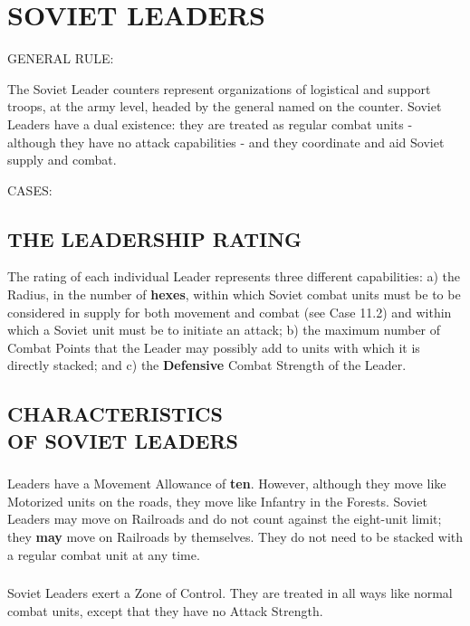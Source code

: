 \clearpage
\section{SOVIET LEADERS}

GENERAL RULE:

The Soviet Leader counters represent organizations of logistical and support troops, at the army level, headed by the general named on the counter. Soviet Leaders have a dual existence: they are treated as regular combat units - although they have no attack capabilities - and they coordinate and aid Soviet supply and combat.

CASES:

\subsection{THE LEADERSHIP RATING}

The rating of each individual Leader represents three different capabilities: a) the Radius, in the number of \textbf{hexes}, within which Soviet combat units must be to be considered in supply for both movement and combat (see Case 11.2) and within which a Soviet unit must be to initiate an attack; b) the maximum number of Combat Points that the Leader may possibly add to units with which it is directly stacked; and c) the \textbf{Defensive} Combat Strength of the Leader.

\subsection{CHARACTERISTICS\\OF SOVIET LEADERS}

\subsubsection{} Leaders have a Movement Allowance of \textbf{ten}. However, although they move like Motorized units on the roads, they move like Infantry in the Forests. Soviet Leaders may move on Railroads and do not count against the eight-unit limit; they \textbf{may} move on Railroads by themselves. They do not need to be stacked with a regular combat unit at any time.

\subsubsection{} Soviet Leaders exert a Zone of Control. They are treated in all ways like normal combat units, except that they have no Attack Strength.

